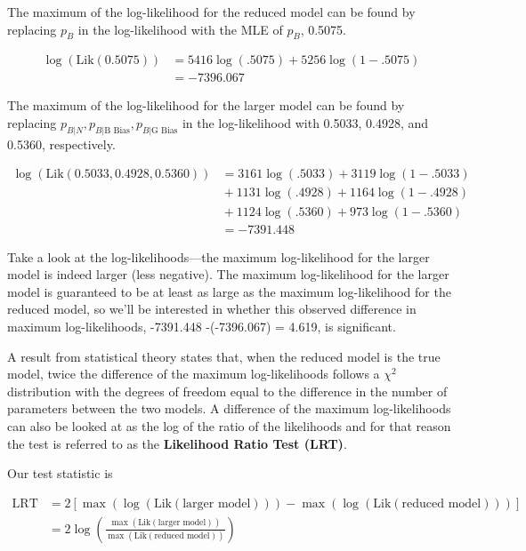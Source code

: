 \documentclass[
]{krantz}
\newcommand{\Lik}{\mathrm{Lik}}
\newcommand{\neutral}{p_{B|N}}
\newcommand{\gbias}{p_{B|\textrm{G Bias}}}
\newcommand{\bbias}{p_{B|\textrm{B Bias}}}
\begin{document}
The maximum of the log-likelihood for the reduced model can be found by replacing \(p_{B}\) in the log-likelihood with the MLE of \(p_{B}\), 0.5075.

\begin{align*}
\log(\Lik(0.5075))& = 5416\log(.5075) + 5256\log(1-.5075)\\
&= -7396.067
\end{align*}

The maximum of the log-likelihood for the larger model can be found by replacing \(\neutral, \bbias, \gbias\) in the log-likelihood with 0.5033, 0.4928, and 0.5360, respectively.

\begin{align*}
 \log(\Lik(0.5033, 0.4928, 0.5360)) &=  3161\log(.5033)+3119\log(1-.5033)\\
 & {}+ 1131\log(.4928)+1164\log(1-.4928)\\
 & {}+ 1124\log(.5360)+973\log(1-.5360)\\
 &= -7391.448
\end{align*}

Take a look at the log-likelihoods---the maximum log-likelihood for the larger model is indeed larger (less negative). The maximum log-likelihood for the larger model is guaranteed to be at least as large as the maximum log-likelihood for the reduced model, so we'll be interested in whether this observed difference in maximum log-likelihoods, -7391.448 -(-7396.067) = 4.619, is significant.

A result from statistical theory states that, when the reduced model is the true model, twice the difference of the maximum log-likelihoods follows a \(\chi^2\) distribution with the degrees of freedom equal to the difference in the number of parameters between the two models. A difference of the maximum log-likelihoods can also be looked at as the log of the ratio of the likelihoods and for that reason the test is referred to as the \textbf{Likelihood Ratio Test (LRT)}. 

Our test statistic is

\begin{equation*}
\begin{split}    
 \textrm{LRT} &= 2[\max(\log(\Lik(\textrm{larger model}))) - \max(\log(\Lik(\textrm{reduced model})))] \\
     &= 2\log\left(\frac{\max(\Lik(\textrm{larger  model}))}{\max(\Lik(\textrm{reduced model}))} \right)
\end{split}
\end{equation*}
\end{document}
